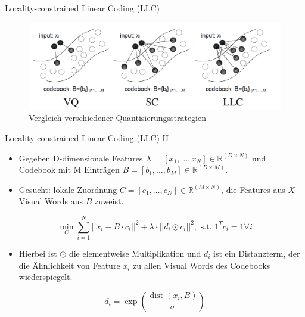 \begin{frame}[t, fragile]{Locality-constrained Linear Coding (LLC)}
	\begin{figure}
		\centering
		\includegraphics[scale=0.7]{img/quant_comp.png}
		\caption{Vergleich verschiedener Quantisierungsstrategien \cite{wyylhg10}}
	\end{figure}
\end{frame}

\begin{frame}[t, fragile]{Locality-constrained Linear Coding (LLC) II}
	\begin{itemize}
		\item Gegeben D-dimensionale Features $X = [x_1, \dots, x_N] \in \mathbb{R}^{(D \times N)}$ und Codebook mit M Einträgen $B = [b_1, \dots, b_M] \in \mathbb{R}^{(D \times M)}$. 
		\item Gesucht: lokale Zuordnung $C = [c_1, \dots, c_N] \in \mathbb{R}^{(M \times N)}$, die Features aus $X$ Visual Words aus $B$ zuweist.  
	\end{itemize}	 
	\begin{equation}
		\min_C \sum_{i=1}^{N} ||x_i - B\cdot c_i||^2 + \lambda\cdot ||d_i \odot c_i||^2, \text{ s.t. } 1^Tc_i = 1 \forall i
	\end{equation}
	\begin{itemize}
		\item Hierbei ist $\odot$ die elementweise Multiplikation und $d_i$ ist ein Distanzterm, der die Ähnlichkeit von Feature $x_i$ zu allen Visual Words des Codebooks wiederspiegelt.
	\end{itemize}
	\begin{equation}
		d_i = \exp \left( \frac{ \mathop{dist}(x_i, B)}{\sigma} \right)
	\end{equation}
\end{frame}

